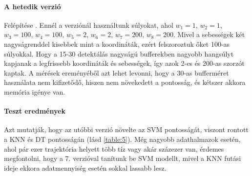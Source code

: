 \documentclass[12pt,a4paper]{article}
\begin{document}
\paragraph{A hetedik verzió} Felépítése \begin{math}[x_0 \cdot w_1, y_0 \cdot w_2, v_{x_0} \cdot w_3, v_{y_0} \cdot w_4, x_l \cdot w_5, y_l \cdot w_6, v_{x_l} \cdot w_7, v_{y_l} \cdot w_8]\end{math}.
Ennél a verziónál használtunk súlyokat, ahol \begin{math}w_1=1\end{math}, \begin{math}w_2=1\end{math}, \begin{math}w_3=100\end{math}, \begin{math}w_4=100\end{math},
\begin{math}w_5=2\end{math}, \begin{math}w_6=2\end{math}, \begin{math}w_7=200\end{math}, \begin{math}w_8=200\end{math}. Mivel a sebességek két
nagyságrenddel kisebbek mint a koordináták, ezért felszoroztuk őket 100-as súlyokkal. Hogy a 15-30 detektálás nagyságú bufferekben nagyobb hangsúlyt kapjanak a legfrissebb
koordináták és sebességek, így azok 2-es és 200-as szorzót kaptak. A mérések ereményéből azt lehet levonni, hogy a 30-as bufferméret használata nem kifizetődő, hiszen nem növekedett a pontosság, és kétszer akkora memória igénye van.
\paragraph{Teszt eredmények} Azt mutatják, hogy az utóbbi verzió növelte az SVM pontosságát, viszont rontott a KNN és DT pontosságán (lásd \ref{table:5}). Még nagyobb adathalmazok esetén, ahol pár ezer trajektória helyett több tíz vagy akár százezer van, érdemes megfontolni, hogy a 7. verzióval tanítunk be SVM modellt, mivel a KNN futási ideje ekkora adatmennyiség esetén sokkal lassabb lesz.
\end{document}
